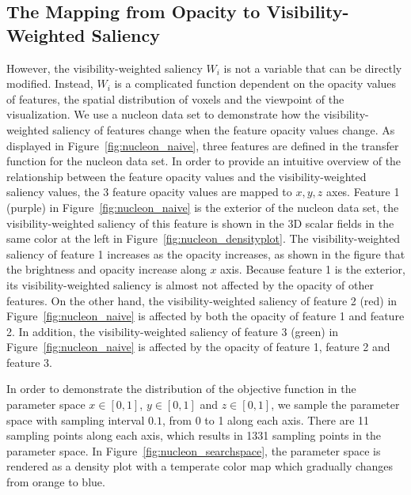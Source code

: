 \subsection{The Mapping from Opacity to Visibility-Weighted Saliency}
However, the visibility-weighted saliency $ W_{i} $ is not a variable that can be directly modified. Instead, $ W_{i} $ is a complicated function dependent on the opacity values of features, the spatial distribution of voxels and the viewpoint of the visualization.
We use a nucleon data set to demonstrate how the visibility-weighted saliency of features change when the feature opacity values change. As displayed in Figure~\ref{fig:nucleon_naive}, three features are defined in the transfer function for the nucleon data set.
In order to provide an intuitive overview of the relationship between the feature opacity values and the visibility-weighted saliency values, the 3 feature opacity values are mapped to $ x, y, z $ axes. Feature 1 (purple) in Figure~\ref{fig:nucleon_naive} is the exterior of the nucleon data set, the visibility-weighted saliency of this feature is shown in the 3D scalar fields in the same color at the left in Figure~\ref{fig:nucleon_densityplot}. The visibility-weighted saliency of feature 1 increases as the opacity increases, as shown in the figure that the brightness and opacity increase along $ x $ axis. Because feature 1 is the exterior, its visibility-weighted saliency is almost not affected by the opacity of other features. On the other hand, the visibility-weighted saliency of feature 2 (red) in Figure~\ref{fig:nucleon_naive} is affected by both the opacity of feature 1 and feature 2. In addition, the visibility-weighted saliency of feature 3 (green) in Figure~\ref{fig:nucleon_naive} is affected by the opacity of feature 1, feature 2 and feature 3.

In order to demonstrate the distribution of the objective function in the parameter space $ x \in [0,1] $, $ y \in [0,1] $ and $ z \in [0,1] $, we sample the parameter space with sampling interval $ 0.1 $, from 0 to 1 along each axis. There are 11 sampling points along each axis, which results in 1331 sampling points in the parameter space. In Figure~\ref{fig:nucleon_searchspace}, the parameter space is rendered as a density plot with a temperate color map which gradually changes from orange to blue.

